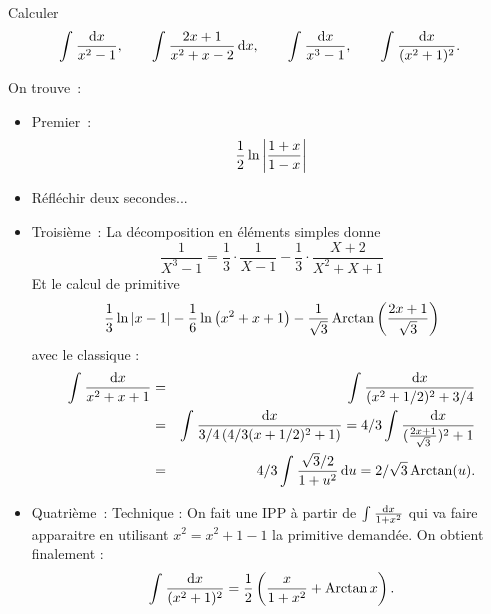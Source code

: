 \documentclass{magnolia}
\begin{document}
\begin{exoUnique}
\exo Calculer
  \[\priminv{x^2-1}{x}, \qquad \prim{\frac{2x+1}{x^2+x-2}}{x},  \qquad
    \priminv{x^3-1}{x}, \qquad \priminv{(x^2+1)^2}{x}.\]
  \begin{sol}
  On trouve~:
  \begin{itemize}
  \item Premier~:
     \[\frac{1}{2}\ln\abs{\frac{1+x}{1-x}}\]
  \item Réfléchir deux secondes...
  \item Troisième~:
     La décomposition en éléments simples donne
     \[\frac{1}{X^3-1}=\frac{1}{3}\cdot\frac{1}{X-1}-\frac{1}{3}\cdot
       \frac{X+2}{X^2+X+1}\]
     Et le calcul de primitive
     \[\frac{1}{3}\ln\abs{x-1}-\frac{1}{6}\ln\p{x^2+x+1}-\frac{1}{\sqrt{3}}
       \arctan\p{\frac{2x+1}{\sqrt{3}}}\]
       avec le classique :
       \begin{eqnarray*}\priminv{x^2+x+1}{x}&=&\priminv{(x^2+1/2)^2+3/4}{x}\\
       &=&\priminv{3/4\p{4/3(x+1/2)^2+1}}{x}=4/3\priminv{(\frac{2x+1}{\sqrt{3}})^2+1}{x}\\&=&4/3\prim{\frac{\sqrt{3}/2}{1+u^2}}{u}=2/\sqrt{3}\arctan(u).
       \end{eqnarray*}
    \item Quatrième~:
    Technique : On fait une IPP à partir de $\priminv{1+x^2}{x}$ qui va faire apparaitre en utilisant $x^2=x^2+1-1$ la primitive demandée. On obtient finalement :
    $$\priminv{(x^2+1)^2}{x}=\frac{1}{2}\p{\frac{x}{1+x^2}+\arctan x}.$$
  \end{itemize}
  \end{sol}
\end{exoUnique}
\end{document}
